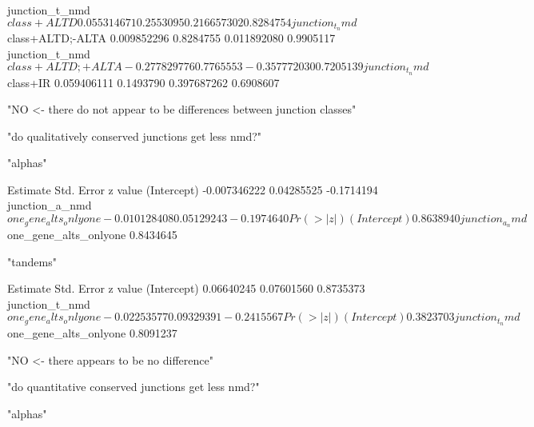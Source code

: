 \documentclass{article}
\begin{document}
\begin{Schunk}
\begin{Soutput}
junction_t_nmd$class+ALTD        0.055314671  0.2553095  0.216657302 0.8284754
junction_t_nmd$class+ALTD;-ALTA  0.009852296  0.8284755  0.011892080 0.9905117
junction_t_nmd$class+ALTD;+ALTA -0.277829776  0.7765553 -0.357772030 0.7205139
junction_t_nmd$class+IR          0.059406111  0.1493790  0.397687262 0.6908607
\end{Soutput}
\begin{Soutput}
[1] "NO <- there do not appear to be differences between junction classes"
\end{Soutput}
\begin{Soutput}
[1] "do qualitatively conserved junctions get less nmd?"
\end{Soutput}
\begin{Soutput}
[1] "alphas"
\end{Soutput}
\begin{Soutput}
                                         Estimate Std. Error    z value
(Intercept)                          -0.007346222 0.04285525 -0.1714194
junction_a_nmd$one_gene_alts_onlyone -0.010128408 0.05129243 -0.1974640
                                      Pr(>|z|)
(Intercept)                          0.8638940
junction_a_nmd$one_gene_alts_onlyone 0.8434645
\end{Soutput}
\begin{Soutput}
[1] "tandems"
\end{Soutput}
\begin{Soutput}
                                        Estimate Std. Error    z value
(Intercept)                           0.06640245 0.07601560  0.8735373
junction_t_nmd$one_gene_alts_onlyone -0.02253577 0.09329391 -0.2415567
                                      Pr(>|z|)
(Intercept)                          0.3823703
junction_t_nmd$one_gene_alts_onlyone 0.8091237
\end{Soutput}
\begin{Soutput}
[1] "NO  <- there appears to be no difference"
\end{Soutput}
\begin{Soutput}
[1] "do quantitative conserved junctions get less nmd?"
\end{Soutput}
\begin{Soutput}
[1] "alphas"
\end{Soutput}
\end{Schunk}
\end{document}
